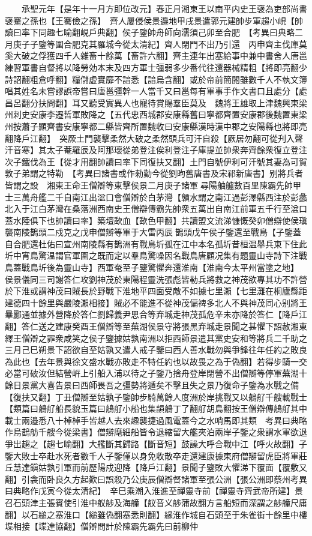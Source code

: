 　　承聖元年【是年十一月方即位改元】春正月湘東王以南平内史王襃為吏部尚書襃騫之孫也【王騫儉之孫】　齊人屢侵侯景邉地甲戌景遣郭元建帥步軍趨小峴【帥讀曰率下同趣七喻翻峴戶典翻】侯子鑒帥舟師向濡須己卯至合肥　【考異曰典略二月庚子子鑒等圍合肥克其羅城今從太清紀】齊人閉門不出乃引還　丙申齊主伐庫莫奚大破之俘獲四千人雜畜十餘萬【畜許六翻】齊主連年出塞給事中兼中書舍人唐邕練習軍書自督將以降勞効本末及四方軍士彊弱多少番代往還器械精粗【將即亮翻少詩詔翻粗倉呼翻】糧儲虚實靡不諳悉【諳烏含翻】或於帝前簡閱雖數千人不執文簿唱其姓名未嘗謬誤帝嘗曰唐邕彊幹一人當千又曰邕每有軍事手作文書口且處分【處昌呂翻分扶問翻】耳又聽受實異人也寵待賞賜羣臣莫及　魏將王雄取上津魏興東梁州刺史安康李遷哲軍敗降之【五代忠西城郡安康縣舊曰寧都齊置安康郡後魏置東梁州按蕭子顯齊書安康寧都二縣皆齊所置魏收曰安康縣漢時漢中郡之安陽縣也將即亮翻降戶江翻】　突厥土門襲擊柔然大破之柔然頭兵可汗自殺【厥居勿翻可從刋入聲汗音寒】其太子菴羅辰及阿那瓌從弟登注俟利登注子庫提並帥衆奔齊餘衆復立登注次子鐵伐為王【從才用翻帥讀曰率下同復扶又翻】土門自號伊利可汗號其妻為可賀敦子弟謂之特勒　【考異曰諸書或作勑勤今從劉昫舊唐書及宋祁新唐書】别將兵者皆謂之設　湘東王命王僧辯等東擊侯景二月庚子諸軍尋陽舳艫數百里陳霸先帥甲士三萬舟艦二千自南江出湓口會僧辯於白茅灣【贑水謂之南江過彭澤縣西注於彭蠡北入于江白茅灣在桑落洲西南史王僧辯傳霸先帥衆五萬出自南江前軍五千行至湓口蓋水陸俱下也帥讀曰率】築壇歃血【歃色甲翻】共讀盟文流涕慷慨癸卯僧辯使侯瑱襲南陵鵲頭二戍克之戊申僧辯等軍于大雷丙辰鵲頭戊午侯子鑒還至戰鳥【子鑒蓋自合肥還杜佑曰宣州南陵縣有鵲洲有戰鳥圻孤在江中本名孤圻昔桓温舉兵東下住此圻中宵鳥驚温謂官軍圍之既而定以羣鳥驚噪因名戰鳥唐顧况集有題靈山寺詩下注戰鳥蓋戰鳥圻後為靈山寺】西軍奄至子鑒驚懼奔還淮南【淮南今太平州當塗之地】　侯景儀同三司謝答仁攻劉神茂於東陽程靈洗張彪皆勒兵將救之神茂欲專其功不許營於下淮或謂神茂曰賊長於野戰下淮地平四面受敵不如據七里瀨【七里灘在桐廬縣距建德四十餘里與嚴陵瀨相接】賊必不能進不從神茂偏禆多北人不與神茂同心别將王曅酈通並據外營降於答仁劉歸義尹思合等弃城走神茂孤危辛未亦降於答仁【降戶江翻】答仁送之建康癸酉王僧辯等至蕪湖侯景守將張黑弃城走景聞之甚懼下詔赦湘東繹王僧辯之罪衆咸笑之侯子鑒據姑孰南洲以拒西師景遣其黨史安和等將兵二千助之三月己巳朔景下詔欲自至姑孰又遣人戒子鑒曰西人善水戰勿與爭鋒往年任約之敗良為此也【去年景與徐文盛水戰亦敗走不特任約也以故畏之為于偽翻】若得步騎一交必當可破汝但結營㟁上引船入浦以待之子鑒乃捨舟登岸閉營不出僧辯等停軍蕪湖十餘日景黨大喜告景曰西師畏吾之彊勢將遁矣不擊且失之景乃復命子鑒為水戰之備【復扶又翻】丁丑僧辯至姑孰子鑒帥步騎萬餘人度洲於岸挑戰又以鵃䑠千艘載戰士【類篇曰鵃䑠船長貌玉篇曰鵃䑠小船也集韻鵃丁了翻䑠胡鳥翻按王僧辯傳鵃䑠其中載士兩邉悉八十棹棹手皆越人去來趣襲捷過風電蓋今之水哨馬即其類　考異曰典略作烏鵲舫千艘今從梁書】僧辯麾細船皆令退縮留大艦夾泊兩岸子鑒之衆謂水軍欲退爭出趨之【趨七喻翻】大艦斷其歸路【斷音短】鼓譟大呼合戰中江【呼火故翻】子鑒大敗士卒赴水死者數千人子鑒僅以身免收散卒走還建康據東府僧辯留虎臣將軍莊丘慧達鎭姑孰引軍而前歷陽戍迎降【降戶江翻】景聞子鑒敗大懼涕下覆面【覆敷又翻】引衾而卧良久方起歎曰誤殺乃公庚辰僧辯督諸軍至張公洲【張公洲即蔡州考異曰典略作戊寅今從太清紀】　辛巳乘潮入淮進至禪靈寺前【禪靈寺齊武帝所建】景召石頭津主張賓使引淮中舣䑰及海艟【舣音义䑰蒲故翻方言船短而深謂之䑰艟尺庸翻】以石縋之塞淮口【縋雖偽翻塞悉則翻】緣淮作城自石頭至于朱雀街十餘里中樓堞相接【堞達協翻】僧辯問計於陳霸先霸先曰前柳仲